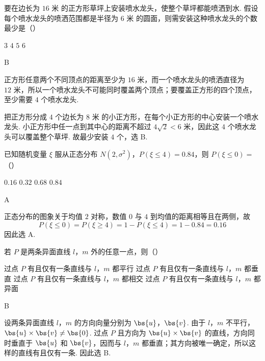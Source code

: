 \begin{problem}
要在边长为 \(16\text{ 米}\) 的正方形草坪上安装喷水龙头，使整个草坪都能喷洒到水. 假设每个喷水龙头的喷洒范围都是半径为 \(6\text{ 米}\) 的圆面，则需安装这种喷水龙头的个数最少是（\quad）


\choices
    {\(3\)}
    {\(4\)}
    {\(5\)}
    {\(6\)}
\begin{answer}
B
\end{answer}

\begin{solution}
正方形任意两个不同顶点的距离至少为 \(16\text{ 米}\)，而一个喷水龙头的喷洒直径为 \(12\text{ 米}\)，所以一个喷水龙头不可能同时覆盖两个顶点；要覆盖正方形的四个顶点，至少需要 \(4\) 个喷水龙头.

把正方形分成 \(4\) 个边长为 \(8\text{ 米}\) 的小正方形，在每个小正方形的中心安装一个喷水龙头. 小正方形中任一点到其中心的距离不超过 \(4\sqrt{2}<6\text{ 米}\)，因此这 \(4\) 个喷水龙头可以覆盖整个草坪. 故最少安装 \(4\) 个，选 B.
\end{solution}
\end{problem}

\begin{problem}
已知随机变量 \(\xi\) 服从正态分布 \(N(2, \sigma^2)\)，\(P(\xi \leqslant 4) = 0.84\)，则 \(P(\xi \leqslant 0) =\)（\quad）

\choices
    {\(0.16\)}
    {\(0.32\)}
    {\(0.68\)}
    {\(0.84\)}
\begin{answer}
A
\end{answer}

\begin{solution}
正态分布的图象关于均值 \(2\) 对称，数值 \(0\) 与 \(4\) 到均值的距离相等且在两侧，故
\[
P(\xi\leqslant0)=P(\xi\geqslant4)=1-P(\xi\leqslant4)=1-0.84=0.16
\]
因此选 A.
\end{solution}
\end{problem}

\begin{problem}
若 \(P\) 是两条异面直线 \(l\)，\(m\) 外的任意一点，则（\quad）

\choices
    {过点 \(P\) 有且仅有一条直线与 \(l\)，\(m\) 都平行}
    {过点 \(P\) 有且仅有一条直线与 \(l\)，\(m\) 都垂直}
    {过点 \(P\) 有且仅有一条直线与 \(l\)，\(m\) 都相交}
    {过点 \(P\) 有且仅有一条直线与 \(l\)，\(m\) 都异面}
\begin{answer}
B
\end{answer}

\begin{solution}
设两条异面直线 \(l\)，\(m\) 的方向向量分别为 \(\bs{u}\)，\(\bs{v}\). 由于 \(l\)，\(m\) 不平行，\(\bs{u}\times\bs{v}\ne\bs{0}\). 过点 \(P\) 且方向为 \(\bs{u}\times\bs{v}\) 的直线，方向同时垂直于 \(\bs{u}\) 和 \(\bs{v}\)，因而与 \(l\)，\(m\) 都垂直；其方向被唯一确定，所以这样的直线有且仅有一条. 因此选 B.
\end{solution}
\end{problem}

